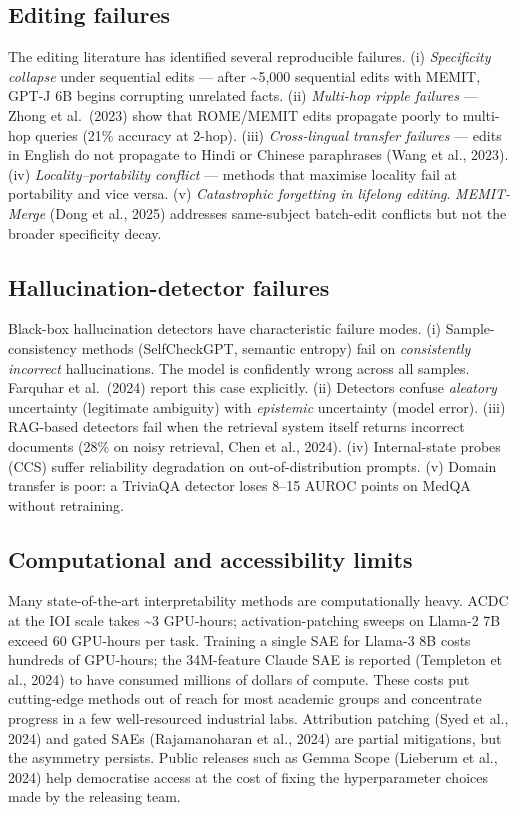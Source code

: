 \subsection{Editing failures}\label{editing-failures}

The editing literature has identified several reproducible failures. (i) \emph{Specificity collapse} under sequential edits --- after \textasciitilde5,000 sequential edits with MEMIT, GPT-J 6B begins corrupting unrelated facts. (ii) \emph{Multi-hop ripple failures} --- Zhong et al.~(2023) show that ROME/MEMIT edits propagate poorly to multi-hop queries (21\% accuracy at 2-hop). (iii) \emph{Cross-lingual transfer failures} --- edits in English do not propagate to Hindi or Chinese paraphrases (Wang et al., 2023). (iv) \emph{Locality--portability conflict} --- methods that maximise locality fail at portability and vice versa. (v) \emph{Catastrophic forgetting in lifelong editing}. \emph{MEMIT-Merge} (Dong et al., 2025) addresses same-subject batch-edit conflicts but not the broader specificity decay.

\subsection{Hallucination-detector failures}\label{hallucination-detector-failures}

Black-box hallucination detectors have characteristic failure modes. (i) Sample-consistency methods (SelfCheckGPT, semantic entropy) fail on \emph{consistently incorrect} hallucinations. The model is confidently wrong across all samples. Farquhar et al.~(2024) report this case explicitly. (ii) Detectors confuse \emph{aleatory} uncertainty (legitimate ambiguity) with \emph{epistemic} uncertainty (model error). (iii) RAG-based detectors fail when the retrieval system itself returns incorrect documents (28\% on noisy retrieval, Chen et al., 2024). (iv) Internal-state probes (CCS) suffer reliability degradation on out-of-distribution prompts. (v) Domain transfer is poor: a TriviaQA detector loses 8--15 AUROC points on MedQA without retraining.

\subsection{Computational and accessibility limits}\label{computational-and-accessibility-limits}

Many state-of-the-art interpretability methods are computationally heavy. ACDC at the IOI scale takes \textasciitilde3 GPU-hours; activation-patching sweeps on Llama-2 7B exceed 60 GPU-hours per task. Training a single SAE for Llama-3 8B costs hundreds of GPU-hours; the 34M-feature Claude SAE is reported (Templeton et al., 2024) to have consumed millions of dollars of compute. These costs put cutting-edge methods out of reach for most academic groups and concentrate progress in a few well-resourced industrial labs. Attribution patching (Syed et al., 2024) and gated SAEs (Rajamanoharan et al., 2024) are partial mitigations, but the asymmetry persists. Public releases such as Gemma Scope (Lieberum et al., 2024) help democratise access at the cost of fixing the hyperparameter choices made by the releasing team.

